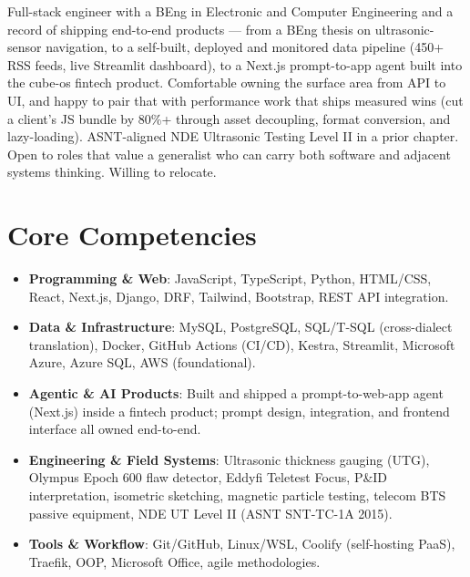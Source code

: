 \documentclass[11pt,a4paper,sans]{moderncv}
\begin{document}
\makecvtitle


\vspace{6pt}
\small{Full-stack engineer with a BEng in Electronic and Computer Engineering and a record of shipping end-to-end products — from a BEng thesis on ultrasonic-sensor navigation, to a self-built, deployed and monitored data pipeline (450+ RSS feeds, live Streamlit dashboard), to a Next.js prompt-to-app agent built into the cube-os fintech product. Comfortable owning the surface area from API to UI, and happy to pair that with performance work that ships measured wins (cut a client's JS bundle by 80\%+ through asset decoupling, format conversion, and lazy-loading). ASNT-aligned NDE Ultrasonic Testing Level II in a prior chapter. Open to roles that value a generalist who can carry both software and adjacent systems thinking. Willing to relocate.}


\section{Core Competencies}
\vspace{1pt}
\begin{itemize}

\item \textbf{Programming \& Web}: JavaScript, TypeScript, Python, HTML/CSS, React, Next.js, Django, DRF, Tailwind, Bootstrap, REST API integration.

\item \textbf{Data \& Infrastructure}: MySQL, PostgreSQL, SQL/T-SQL (cross-dialect translation), Docker, GitHub Actions (CI/CD), Kestra, Streamlit, Microsoft Azure, Azure SQL, AWS (foundational).

\item \textbf{Agentic \& AI Products}: Built and shipped a prompt-to-web-app agent (Next.js) inside a fintech product; prompt design, integration, and frontend interface all owned end-to-end.

\item \textbf{Engineering \& Field Systems}: Ultrasonic thickness gauging (UTG), Olympus Epoch 600 flaw detector, Eddyfi Teletest Focus, P\&ID interpretation, isometric sketching, magnetic particle testing, telecom BTS passive equipment, NDE UT Level II (ASNT SNT-TC-1A 2015).

\item \textbf{Tools \& Workflow}: Git/GitHub, Linux/WSL, Coolify (self-hosting PaaS), Traefik, OOP, Microsoft Office, agile methodologies.

\end{itemize}
\end{document}
